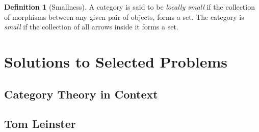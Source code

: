 \documentclass{scrbook}
\theoremstyle{definition}\newtheorem{defn}{Definition}
\theoremstyle{definition}\newtheorem*{rmk}{Remark}
\begin{document}
\begin{defn}[Smallness]
  A category is said to be \emph{locally small} if the collection of morphisms
  between any given pair of objects, forms a set. The category is \emph{small}
  if the collection of all arrows inside it forms a set.
\end{defn}

\newpage

\section{Solutions to Selected Problems}
\subsection{Category Theory in Context}
\subsection{Tom Leinster}



 
\end{document}
